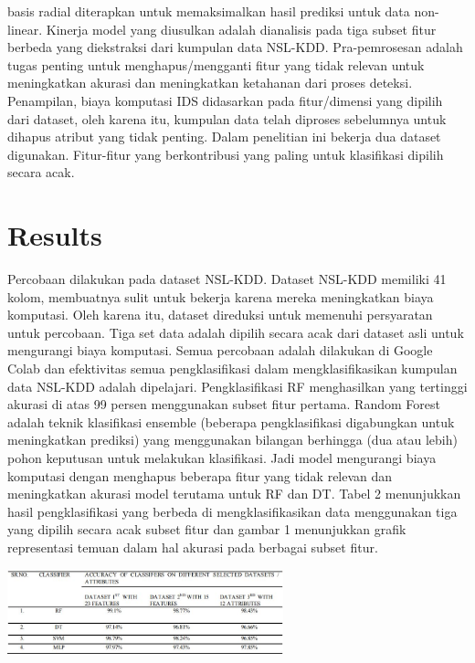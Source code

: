 \documentclass[conference]{IEEEtran}
\begin{document}
basis radial diterapkan untuk memaksimalkan hasil prediksi untuk data non-linear. Kinerja model yang diusulkan adalah dianalisis pada tiga subset fitur berbeda yang diekstraksi dari kumpulan data NSL-KDD. Pra-pemrosesan adalah tugas penting untuk menghapus/mengganti fitur yang tidak relevan untuk meningkatkan akurasi dan meningkatkan ketahanan dari proses deteksi. Penampilan, biaya komputasi IDS didasarkan pada fitur/dimensi yang dipilih dari dataset, oleh karena itu, kumpulan data telah diproses sebelumnya untuk dihapus atribut yang tidak penting. Dalam penelitian ini bekerja dua dataset digunakan. Fitur-fitur yang berkontribusi yang paling untuk klasifikasi dipilih secara acak.

\section{Results}
Percobaan dilakukan pada dataset NSL-KDD. Dataset NSL-KDD memiliki 41 kolom, membuatnya sulit untuk bekerja karena mereka meningkatkan biaya komputasi. Oleh karena itu, dataset direduksi untuk memenuhi persyaratan untuk percobaan. Tiga set data adalah dipilih secara acak dari dataset asli untuk mengurangi biaya komputasi. Semua percobaan adalah dilakukan di Google Colab dan efektivitas semua pengklasifikasi dalam mengklasifikasikan kumpulan data NSL-KDD adalah dipelajari. Pengklasifikasi RF menghasilkan yang tertinggi akurasi di atas 99 persen menggunakan subset fitur pertama. Random Forest adalah teknik klasifikasi ensemble (beberapa pengklasifikasi digabungkan untuk meningkatkan prediksi) yang menggunakan bilangan berhingga (dua atau lebih) pohon keputusan untuk melakukan klasifikasi. Jadi model mengurangi biaya komputasi dengan menghapus beberapa fitur yang tidak relevan dan meningkatkan akurasi model terutama untuk RF dan DT. Tabel 2 menunjukkan hasil pengklasifikasi yang berbeda di mengklasifikasikan data menggunakan tiga yang dipilih secara acak subset fitur dan gambar 1 menunjukkan grafik representasi temuan dalam hal akurasi pada berbagai subset fitur.

\begin{minipage}{\linewidth}
\centerline{\includegraphics[width=80mm]{Gambar/gambar2.JPG}}
\label{fig2}
\end{minipage}
\end{document}
